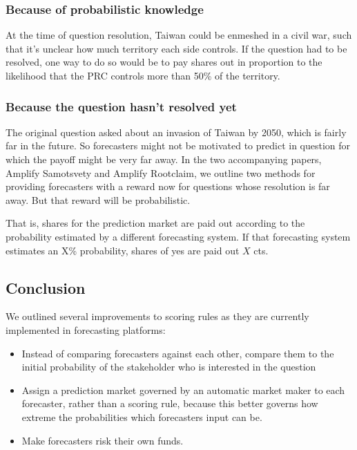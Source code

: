 \documentclass[]{article}
\providecommand{\tightlist}{%
  \setlength{\itemsep}{0pt}\setlength{\parskip}{0pt}}
\begin{document}
\hypertarget{because-of-probabilistic-knowledge}{%
\subsubsection{Because of probabilistic
knowledge}\label{because-of-probabilistic-knowledge}}

At the time of question resolution, Taiwan could be enmeshed in a civil
war, such that it's unclear how much territory each side controls. If
the question had to be resolved, one way to do so would be to pay shares
out in proportion to the likelihood that the PRC controls more than 50\%
of the territory.

\hypertarget{because-the-question-hasnt-resolved-yet}{%
\subsubsection{Because the question hasn't resolved
yet}\label{because-the-question-hasnt-resolved-yet}}

The original question asked about an invasion of Taiwan by 2050, which
is fairly far in the future. So forecasters might not be motivated to
predict in question for which the payoff might be very far away. In the
two accompanying papers, Amplify Samotsvety and Amplify Rootclaim, we
outline two methods for providing forecasters with a reward now for
questions whose resolution is far away. But that reward will be
probabilistic.

That is, shares for the prediction market are paid out according to the
probability estimated by a different forecasting system. If that
forecasting system estimates an X\% probability, shares of yes are paid
out \(X\) cts.

\hypertarget{conclusion}{%
\subsection{Conclusion}\label{conclusion}}

We outlined several improvements to scoring rules as they are currently
implemented in forecasting platforms:

\begin{itemize}
\tightlist
\item
  Instead of comparing forecasters against each other, compare them to
  the initial probability of the stakeholder who is interested in the
  question
\item
  Assign a prediction market governed by an automatic market maker to
  each forecaster, rather than a scoring rule, because this better
  governs how extreme the probabilities which forecasters input can be.
\item
  Make forecasters risk their own funds.
\end{itemize}
\end{document}

